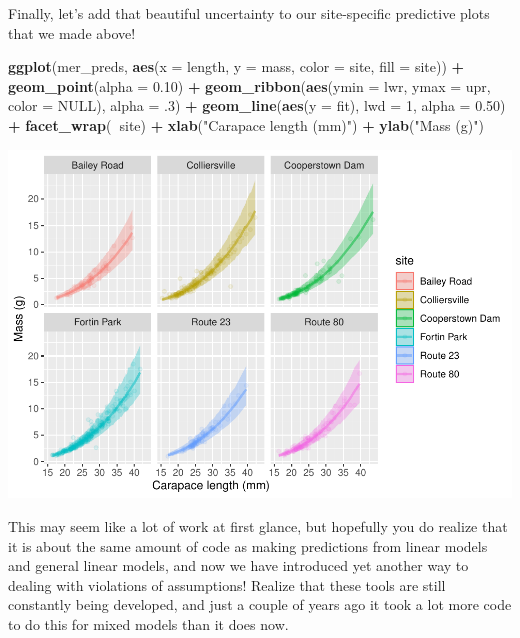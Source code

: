 \documentclass[
]{book}
\newenvironment{Shaded}{\begin{snugshade}}{\end{snugshade}}
\newcommand{\DataTypeTok}[1]{\textcolor[rgb]{0.13,0.29,0.53}{#1}}
\newcommand{\DecValTok}[1]{\textcolor[rgb]{0.00,0.00,0.81}{#1}}
\newcommand{\FloatTok}[1]{\textcolor[rgb]{0.00,0.00,0.81}{#1}}
\newcommand{\KeywordTok}[1]{\textcolor[rgb]{0.13,0.29,0.53}{\textbf{#1}}}
\newcommand{\NormalTok}[1]{#1}
\newcommand{\OperatorTok}[1]{\textcolor[rgb]{0.81,0.36,0.00}{\textbf{#1}}}
\newcommand{\OtherTok}[1]{\textcolor[rgb]{0.56,0.35,0.01}{#1}}
\newcommand{\StringTok}[1]{\textcolor[rgb]{0.31,0.60,0.02}{#1}}
\begin{document}
Finally, let's add that beautiful uncertainty to our site-specific predictive plots that we made above!

\begin{Shaded}
\begin{Highlighting}[]
\KeywordTok{ggplot}\NormalTok{(mer_preds, }\KeywordTok{aes}\NormalTok{(}\DataTypeTok{x =}\NormalTok{ length, }\DataTypeTok{y =}\NormalTok{ mass, }\DataTypeTok{color =}\NormalTok{ site, }\DataTypeTok{fill =}\NormalTok{ site)) }\OperatorTok{+}
\StringTok{  }\KeywordTok{geom_point}\NormalTok{(}\DataTypeTok{alpha =} \FloatTok{0.10}\NormalTok{) }\OperatorTok{+}
\StringTok{  }\KeywordTok{geom_ribbon}\NormalTok{(}\KeywordTok{aes}\NormalTok{(}\DataTypeTok{ymin =}\NormalTok{ lwr, }\DataTypeTok{ymax =}\NormalTok{ upr, }\DataTypeTok{color =} \OtherTok{NULL}\NormalTok{), }\DataTypeTok{alpha =} \FloatTok{.3}\NormalTok{) }\OperatorTok{+}
\StringTok{  }\KeywordTok{geom_line}\NormalTok{(}\KeywordTok{aes}\NormalTok{(}\DataTypeTok{y =}\NormalTok{ fit), }\DataTypeTok{lwd =} \DecValTok{1}\NormalTok{, }\DataTypeTok{alpha =} \FloatTok{0.50}\NormalTok{) }\OperatorTok{+}
\StringTok{  }\KeywordTok{facet_wrap}\NormalTok{(}\OperatorTok{~}\NormalTok{site) }\OperatorTok{+}
\StringTok{  }\KeywordTok{xlab}\NormalTok{(}\StringTok{"Carapace length (mm)"}\NormalTok{) }\OperatorTok{+}
\StringTok{  }\KeywordTok{ylab}\NormalTok{(}\StringTok{"Mass (g)"}\NormalTok{)}
\end{Highlighting}
\end{Shaded}

\includegraphics{worstr_files/figure-latex/unnamed-chunk-384-1.pdf}

This may seem like a lot of work at first glance, but hopefully you do realize that it is about the same amount of code as making predictions from linear models and general linear models, and now we have introduced yet another way to dealing with violations of assumptions! Realize that these tools are still constantly being developed, and just a couple of years ago it took a lot more code to do this for mixed models than it does now.
\end{document}
